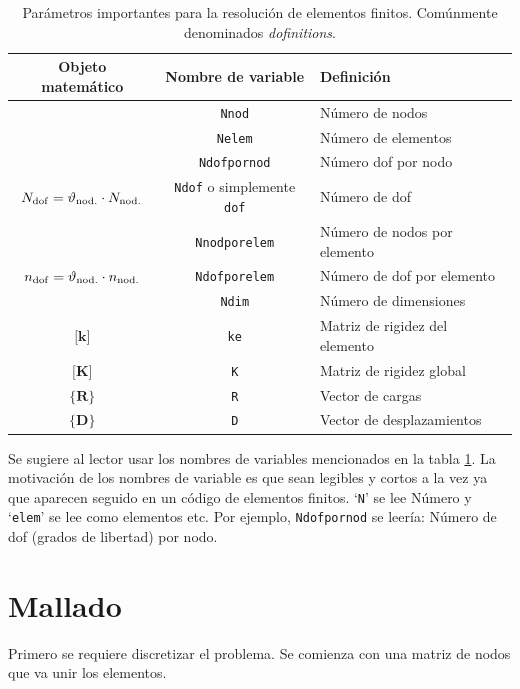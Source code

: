 \documentclass[11pt, a4paper,titlepage]{article}
\newcommand{\Mme}[1]{\boldsymbol{[}\mathbf{#1} \boldsymbol{]}}
\newcommand{\Cme}[1]{\boldsymbol{\{ }\mathbf{#1} \boldsymbol{\}} }
\newcommand{\CD}{\Cme{D}}
\newcommand{\MK}{\Mme{K}}
\newcommand{\Mk}{\Mme{k}}
\newcommand{\CRext}{\Cme{R^{\mathrm{ext.}}}}
\newcommand{\CR}{\Cme{R}}
\begin{document}
\begin{table}[htb!]
	\centering
	\begin{tabular}{ccl}
		Objeto matemático & Nombre de variable & Definición \\ \hline
	\Nnod	& \texttt{Nnod}                   &    Número de nodos        \\
	\Nelem	& \texttt{Nelem}                   &    Número de elementos       \\
	\Ndofpornod	& \texttt{Ndofpornod}                   &    Número dof por nodo       \\
	$N_{\mathrm{dof}}=\vartheta_{\mathrm{nod.}} \cdot N_{\mathrm{nod.}}$	& \texttt{Ndof} {\footnotesize{}o simplemente} \texttt{dof}                   &    Número de dof        \\
	\Nnodporelem	& \texttt{Nnodporelem}                   &    Número de nodos por elemento     \\
	$n_{\mathrm{dof}}= \vartheta_{\mathrm{nod.}} \cdot n_{\mathrm{nod.}}$	& \texttt{Ndofporelem}                   &    Número de dof por elemento       \\
	\Ndims	& \texttt{Ndim}                   &    Número de dimensiones      \\
	$\Mk$	& \texttt{ke}                   &   Matriz de rigidez del elemento      \\
	$\MK$	& \texttt{K}                   &   Matriz de rigidez global      \\
	$\CR$   & \texttt{R}                  &  Vector de cargas \\
	$\CD$   & \texttt{D}                 & Vector de desplazamientos \\
	\end{tabular}

\caption{Parámetros importantes para la resolución de elementos finitos. Comúnmente denominados \textit{dofinitions}.}
\label{tab:VariableDefinitions}
\end{table}

Se sugiere al lector usar los nombres de variables mencionados en la tabla \ref{tab:VariableDefinitions}. La motivación de los nombres de variable es que sean legibles y cortos a la vez ya que aparecen seguido en un código de elementos finitos. `\texttt{N}' se lee Número y `\texttt{elem}' se lee como elementos etc. Por ejemplo, \texttt{Ndofpornod} se leería: Número de dof (grados de libertad) por nodo.

\section{Mallado}
Primero se requiere discretizar el problema. Se comienza con una matriz de nodos que va unir los elementos. 
\end{document}
